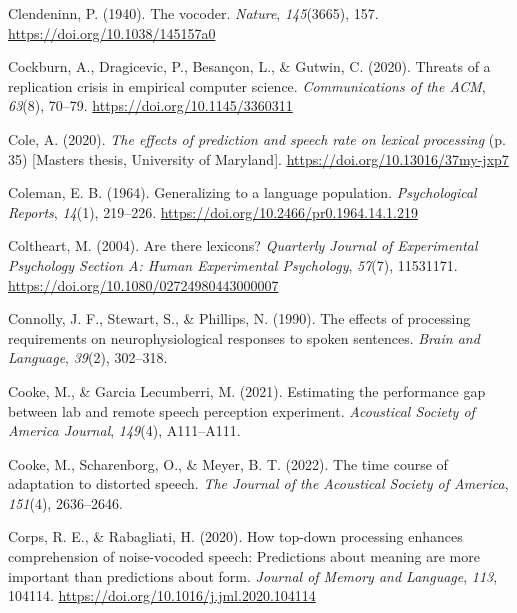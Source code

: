 \documentclass[a4paper, nobind]{templates/ociamthesis}
\newlength{\cslhangindent}
\newenvironment{CSLReferences}[2] %
 {%
  \setlength{\parindent}{0pt}
  \ifodd #1
  \let\oldpar\par
  \def\par{\hangindent=\cslhangindent\oldpar}
  \fi
  \setlength{\parskip}{1mm}
  \setlength{\baselineskip}{6mm}
 }%
 {}
\begin{document}
\begin{CSLReferences}{1}{0}
\leavevmode{}%
Clendeninn, P. (1940). {The vocoder}. \emph{Nature}, \emph{145}(3665), 157. \url{https://doi.org/10.1038/145157a0}

\leavevmode{}%
Cockburn, A., Dragicevic, P., Besançon, L., \& Gutwin, C. (2020). {Threats of a replication crisis in empirical computer science}. \emph{Communications of the ACM}, \emph{63}(8), 70--79. \url{https://doi.org/10.1145/3360311}

\leavevmode{}%
Cole, A. (2020). \emph{{The effects of prediction and speech rate on lexical processing}} (p. 35) {[}Masters thesis, University of Maryland{]}. \url{https://doi.org/10.13016/37my-jxp7}

\leavevmode{}%
Coleman, E. B. (1964). {Generalizing to a language population}. \emph{Psychological Reports}, \emph{14}(1), 219--226. \url{https://doi.org/10.2466/pr0.1964.14.1.219}

\leavevmode{}%
Coltheart, M. (2004). Are there lexicons? \emph{Quarterly Journal of Experimental Psychology Section A: Human Experimental Psychology}, \emph{57}(7), 11531171. \url{https://doi.org/10.1080/02724980443000007}

\leavevmode{}%
Connolly, J. F., Stewart, S., \& Phillips, N. (1990). The effects of processing requirements on neurophysiological responses to spoken sentences. \emph{Brain and Language}, \emph{39}(2), 302--318.

\leavevmode{}%
Cooke, M., \& Garcia Lecumberri, M. (2021). Estimating the performance gap between lab and remote speech perception experiment. \emph{Acoustical Society of America Journal}, \emph{149}(4), A111--A111.

\leavevmode{}%
Cooke, M., Scharenborg, O., \& Meyer, B. T. (2022). The time course of adaptation to distorted speech. \emph{The Journal of the Acoustical Society of America}, \emph{151}(4), 2636--2646.

\leavevmode{}%
Corps, R. E., \& Rabagliati, H. (2020). How top-down processing enhances comprehension of noise-vocoded speech: Predictions about meaning are more important than predictions about form. \emph{Journal of Memory and Language}, \emph{113}, 104114. \url{https://doi.org/10.1016/j.jml.2020.104114}


\end{CSLReferences}
\end{document}
